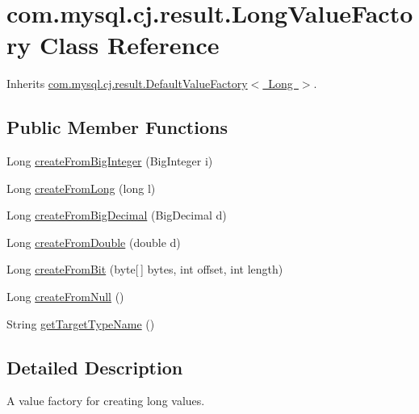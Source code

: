 \hypertarget{classcom_1_1mysql_1_1cj_1_1result_1_1_long_value_factory}{}\section{com.\+mysql.\+cj.\+result.\+Long\+Value\+Factory Class Reference}
\label{classcom_1_1mysql_1_1cj_1_1result_1_1_long_value_factory}


Inherits \mbox{\hyperlink{classcom_1_1mysql_1_1cj_1_1result_1_1_default_value_factory}{com.\+mysql.\+cj.\+result.\+Default\+Value\+Factory$<$ Long $>$}}.

\subsection*{Public Member Functions}
\begin{DoxyCompactItemize}
\item 
Long \mbox{\hyperlink{classcom_1_1mysql_1_1cj_1_1result_1_1_long_value_factory_a7ac17adb9b724b44b8f1e95a0c30d4c4}{create\+From\+Big\+Integer}} (Big\+Integer i)
\item 
Long \mbox{\hyperlink{classcom_1_1mysql_1_1cj_1_1result_1_1_long_value_factory_aff06579b35fd467368cf4ec792fbee5c}{create\+From\+Long}} (long l)
\item 
Long \mbox{\hyperlink{classcom_1_1mysql_1_1cj_1_1result_1_1_long_value_factory_afce07f3792b738f044e6e7769ec4ebc7}{create\+From\+Big\+Decimal}} (Big\+Decimal d)
\item 
Long \mbox{\hyperlink{classcom_1_1mysql_1_1cj_1_1result_1_1_long_value_factory_a517b1b127dfdb6bce9ddd4a139cfde8b}{create\+From\+Double}} (double d)
\item 
Long \mbox{\hyperlink{classcom_1_1mysql_1_1cj_1_1result_1_1_long_value_factory_a3d798a5f5ef704f76a58ba154ef1be35}{create\+From\+Bit}} (byte\mbox{[}$\,$\mbox{]} bytes, int offset, int length)
\item 
Long \mbox{\hyperlink{classcom_1_1mysql_1_1cj_1_1result_1_1_long_value_factory_a77abe2bb6797a666c97ecc9a9a582ec0}{create\+From\+Null}} ()
\item 
String \mbox{\hyperlink{classcom_1_1mysql_1_1cj_1_1result_1_1_long_value_factory_ae2d18f108811fd6b2fb59aff9d931689}{get\+Target\+Type\+Name}} ()
\end{DoxyCompactItemize}


\subsection{Detailed Description}
A value factory for creating long values. 

